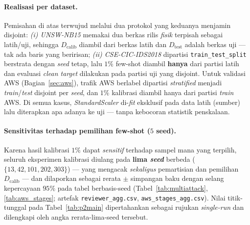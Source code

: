\documentclass[11pt,a4paper]{article}
\begin{document}
\paragraph{Realisasi per dataset.} Pemisahan di atas terwujud melalui dua protokol
yang keduanya menjamin disjoint: \emph{(i) UNSW-NB15} memakai dua berkas rilis
\emph{fisik} terpisah sebagai latih/uji, sehingga $D_{\text{calib}}$ diambil dari
berkas latih dan $D_{\text{test}}$ adalah berkas uji --- tak ada baris yang
beririsan; \emph{(ii) CSE-CIC-IDS2018} dipartisi \texttt{train\_test\_split}
berstrata dengan \emph{seed} tetap, lalu $1\%$ few-shot diambil \textbf{hanya} dari
partisi latih dan evaluasi \emph{clean target} dilakukan pada partisi uji yang
disjoint. Untuk validasi AWS (Bagian~\ref{sec:aws}), trafik AWS berlabel dipartisi
\emph{stratified} menjadi \emph{train}/\emph{test} disjoint per \emph{seed}, dan
$1\%$ kalibrasi diambil hanya dari partisi \emph{train} AWS. Di semua kasus,
\emph{StandardScaler} di-\emph{fit} eksklusif pada data latih (sumber) lalu
diterapkan apa adanya ke uji --- tanpa kebocoran statistik penskalaan.

\paragraph{Sensitivitas terhadap pemilihan few-shot ($5$ seed).} Karena hasil
kalibrasi $1\%$ dapat \emph{sensitif} terhadap sampel mana yang terpilih, seluruh
eksperimen kalibrasi diulang pada \textbf{lima \emph{seed}} berbeda
($\{13,42,101,202,303\}$) --- yang mengacak \emph{sekaligus} pemartisian dan
pemilihan $D_{\text{calib}}$ --- dan dilaporkan sebagai rerata $\pm$ simpangan baku
dengan selang kepercayaan $95\%$ pada tabel berbasis-seed (Tabel~\ref{tab:multiattack},
\ref{tab:aws_stages}; artefak \texttt{reviewer\_agg.csv}, \texttt{aws\_stages\_agg.csv}).
Nilai titik-tunggal pada Tabel~\ref{tab:p2main} dipertahankan sebagai rujukan
\emph{single-run} dan dilengkapi oleh angka rerata-lima-seed tersebut.
\end{document}
